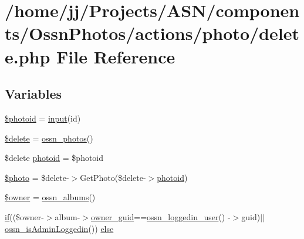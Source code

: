 \hypertarget{components_2_ossn_photos_2actions_2photo_2delete_8php}{}\section{/home/jj/\+Projects/\+A\+S\+N/components/\+Ossn\+Photos/actions/photo/delete.php File Reference}
\label{components_2_ossn_photos_2actions_2photo_2delete_8php}
\subsection*{Variables}
\begin{DoxyCompactItemize}
\item 
\hyperlink{components_2_ossn_photos_2actions_2photo_2delete_8php_a7407adedcade878fe9a46a9abd70298f}{\$photoid} = \hyperlink{ossn_8lib_8input_8php_a64ebee98b041c4f75f71ed3cd73cc8ed}{input}(\textquotesingle{}id\textquotesingle{})
\item 
\hyperlink{components_2_ossn_photos_2actions_2photo_2delete_8php_aba2374a8b713514611e21494ec2fef8d}{\$delete} = \hyperlink{ossn_8lib_8photos_8php_a66e905f107ea10ae8c2aa549b9234c5a}{ossn\+\_\+photos}()
\item 
\$delete \hyperlink{components_2_ossn_photos_2actions_2photo_2delete_8php_abb6af812fbce2cbbad5fc22cdbb4d396}{photoid} = \$photoid
\item 
\hyperlink{components_2_ossn_photos_2actions_2photo_2delete_8php_ae68c67c422f1090027f6eb6ba01b62b2}{\$photo} = \$delete-\/$>$Get\+Photo(\$delete-\/$>$\hyperlink{components_2_ossn_photos_2actions_2photo_2profile_2delete_8php_abb6af812fbce2cbbad5fc22cdbb4d396}{photoid})
\item 
\hyperlink{components_2_ossn_photos_2actions_2photo_2delete_8php_a9aabf46bdb166877480b2094d7ca01a7}{\$owner} = \hyperlink{ossn_8lib_8albums_8php_ab3f5c44ef928976637969807070128a2}{ossn\+\_\+albums}()
\item 
\hyperlink{jquery_8tokeninput_8js_ad8dd46a3cbc004569e34401e9e71771a}{if}((\$owner-\/$>$album-\/$>$\hyperlink{user_8php_a307051fefc937afd02c509c55646f50b}{owner\+\_\+guid}==\hyperlink{ossn_8lib_8users_8php_aa3c8068d0e6638b414d6a2f6c62565b8}{ossn\+\_\+loggedin\+\_\+user}() -\/$>$guid)$\vert$$\vert$\hyperlink{ossn_8lib_8users_8php_abf45a4c659ffd196160e8173c2af1106}{ossn\+\_\+is\+Admin\+Loggedin}()) \hyperlink{components_2_ossn_photos_2actions_2photo_2delete_8php_adafcbfeb696ceaebd2ff640ba0710345}{else}
\end{DoxyCompactItemize}


